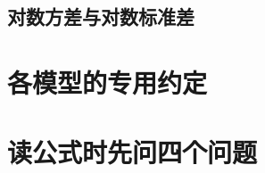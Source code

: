 \subsection{对数方差与对数标准差}
\label{subsec:notation-log-scales}
\contentplaceholder

\section{各模型的专用约定}
\label{sec:notation-model-conventions}
\contentplaceholder

\section{读公式时先问四个问题}
\label{sec:notation-reading-formulas}
\contentplaceholder
